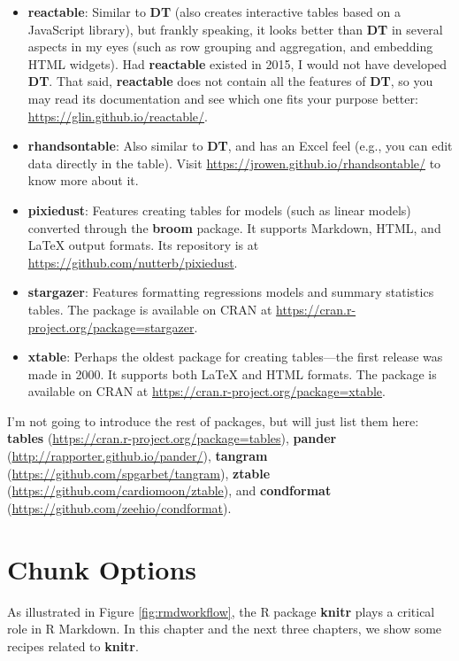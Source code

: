 \documentclass[
  11pt,
]{krantz}
\begin{document}
\begin{itemize}
\item
  \textbf{reactable}: Similar to \textbf{DT} (also creates interactive tables based on a JavaScript library), but frankly speaking, it looks better than \textbf{DT} in several aspects in my eyes (such as row grouping and aggregation, and embedding HTML widgets). Had \textbf{reactable} existed in 2015, I would not have developed \textbf{DT}. That said, \textbf{reactable} does not contain all the features of \textbf{DT}, so you may read its documentation and see which one fits your purpose better: \url{https://glin.github.io/reactable/}.
\item
  \textbf{rhandsontable}: Also similar to \textbf{DT}, and has an Excel feel (e.g., you can edit data directly in the table). Visit \url{https://jrowen.github.io/rhandsontable/} to know more about it.
\item
  \textbf{pixiedust}: Features creating tables for models (such as linear models) converted through the \textbf{broom} package. It supports Markdown, HTML, and LaTeX output formats. Its repository is at \url{https://github.com/nutterb/pixiedust}.
\item
  \textbf{stargazer}: Features formatting regressions models and summary statistics tables. The package is available on CRAN at \url{https://cran.r-project.org/package=stargazer}.
\item
  \textbf{xtable}: Perhaps the oldest package for creating tables---the first release was made in 2000. It supports both LaTeX and HTML formats. The package is available on CRAN at \url{https://cran.r-project.org/package=xtable}.
\end{itemize}

I'm not going to introduce the rest of packages, but will just list them here: \textbf{tables} (\url{https://cran.r-project.org/package=tables}), \textbf{pander} (\url{http://rapporter.github.io/pander/}), \textbf{tangram} (\url{https://github.com/spgarbet/tangram}), \textbf{ztable} (\url{https://github.com/cardiomoon/ztable}), and \textbf{condformat} (\url{https://github.com/zeehio/condformat}).

\hypertarget{chunk-options}{%
\chapter{Chunk Options}\label{chunk-options}}

As illustrated in Figure \ref{fig:rmdworkflow}, the R package \textbf{knitr} plays a critical role in R Markdown. In this chapter and the next three chapters, we show some recipes related to \textbf{knitr}.
\end{document}
